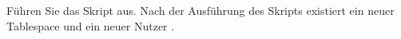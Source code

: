     \item F\"uhren Sie das Skript 
    aus. Nach der Ausf\"uhrung des Skripts existiert ein neuer Tablespace
     und ein neuer Nutzer .
